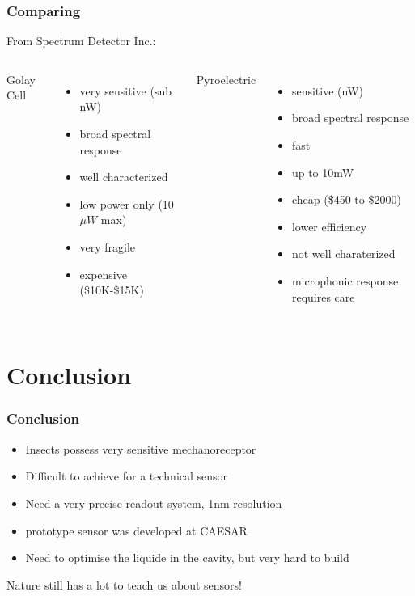 \documentclass[14pt]{beamer}
\begin{document}
\begin{frame}
\frametitle{Comparing}
From Spectrum Detector Inc.:\\

\begin{columns}
Golay Cell
\begin{itemize}
\item very sensitive (sub nW)
\item broad spectral response
\item well characterized
\item low power only (10$\mu W$ max)
\item very fragile
\item expensive (\$10K-\$15K)
\end{itemize}
Pyroelectric
\begin{itemize}
\item sensitive (nW)
\item broad spectral response
\item fast
\item up to 10mW
\item cheap (\$450 to \$2000)
\item lower efficiency
\item not well charaterized
\item microphonic response requires care
\end{itemize}
\end{columns}
\end{frame}

\section{Conclusion}
\begin{frame}
\frametitle{Conclusion}
\begin{itemize}
\item Insects possess very sensitive mechanoreceptor
\item Difficult to achieve for a technical sensor
\item Need a very precise readout system, 1nm resolution
\item prototype sensor was developed at CAESAR
\item Need to optimise the liquide in the cavity, but very hard to build
\end{itemize}
Nature still has a lot to teach us about sensors!
\end{frame}
\end{document}
